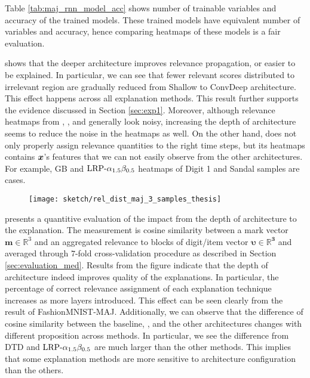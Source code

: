 Table \ref{tab:maj_rnn_model_acc} shows number of trainable variables and accuracy of the trained models. These trained models have equivalent number of variables and accuracy, hence comparing heatmaps of these models is a fair evaluation.

\addfigure{\ref{fig:heatmap_msc_mix_for_thesis}} shows that the deeper architecture improves relevance propagation, or easier to be explained. In particular, we can see that fewer relevant scores distributed to irrelevant region are gradually reduced from Shallow to ConvDeep architecture. This effect happens across all explanation methods. This result further supports the evidence discussed in Section \ref{sec:exp1}.  Moreover, although relevance heatmaps from , , and  generally look noisy, increasing the depth of architecture seems to reduce the noise in the heatmaps as well.   On the other hand,  does not  only properly assign relevance quantities to the right time steps, but its heatmaps contains $\boldsymbol{x}$'s features that we can not easily observe from the other architectures. For example, GB and $\text{LRP-}\alpha_{1.5}\beta_{0.5}$ heatmaps of Digit 1 and Sandal samples are cases.

\clearpage

 \begin{figure}[!hbt]
\centering
\texttt{[image: sketch/rel\_dist\_maj\_3\_samples\_thesis]}



\label{fig:rel_dist_maj_3_samples_thesis}
\end{figure}

\addfigure{\ref{fig:rel_dist_maj_3_samples_thesis}} presents a quantitive  evaluation of the impact from the depth of architecture to the explanation. The measurement is cosine similarity between a mark vector $\boldsymbol{m} \in \mathbb{R}^3$ and an aggregated relevance to blocks of digit/item vector $\boldsymbol{\upsilon \in \mathbb{R}^3 }$ and averaged through $7$-fold cross-validation procedure as described in Section \ref{sec:evaluation_med}. Results from the figure indicate that the depth of architecture indeed improves quality of the explanations. In particular, the percentage of correct relevance assignment of each explanation technique increases as more layers introduced. This effect can be seen clearly from the result of FashionMNIST-MAJ. Additionally, we can observe that the difference of cosine similarity between the baseline, , and the other  architectures changes with different proposition across methods. In particular, we see the difference from DTD and $\text{LRP-}\alpha_{1.5}\beta_{0.5}$ are much larger than the other methods. This implies that some explanation methods are more sensitive to architecture configuration than the others.


